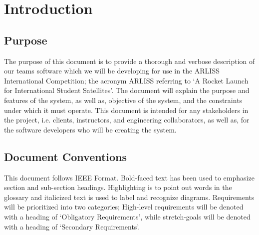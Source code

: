 \documentclass[10pt,onecolumn,draftclsnofoot,document]{IEEEtran}
\begin{document}


\clearpage


\section{Introduction}

\subsection{Purpose}
The purpose of this document is to provide a thorough and verbose description of our teams software which we will be developing for use in the ARLISS International Competition; the acronym ARLISS referring to ‘A Rocket Launch for International Student Satellites’. The document will explain the purpose and features of the system, as well as, objective of the system, and the constraints under which it must operate. This document is intended for any stakeholders in the project, i.e. clients, instructors, and engineering collaborators, as well as, for the software developers who will be creating the system.

\subsection{Document Conventions}
This document follows IEEE Format. Bold-faced text has been used to emphasize section and sub-section headings. Highlighting is to point out words in the glossary and italicized text is used to label and recognize diagrams. Requirements will be prioritized into two categories; High-level requirements will be denoted with a heading of ‘Obligatory Requirements’, while stretch-goals will be denoted with a heading of ‘Secondary Requirements’.
\end{document}
